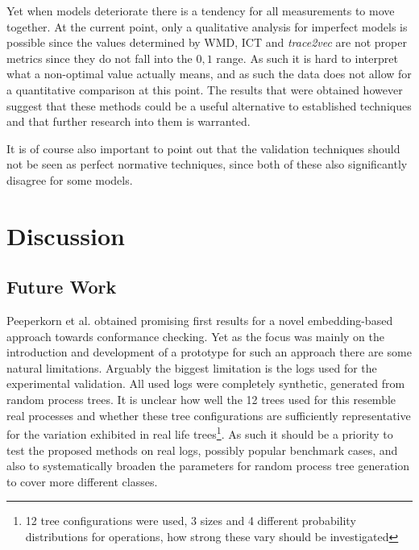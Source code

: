 \documentclass[runningheads]{template/llncs}
\begin{document}
Yet when models deteriorate there is a tendency for all measurements to move together.
At the current point, only a qualitative analysis for imperfect models is possible since the values determined by WMD, ICT and \emph{trace2vec} are not proper metrics since they do not fall into the $0,1$ range.
As such it is hard to interpret what a non-optimal value actually means, and as such the data does not allow for a quantitative comparison  at this point.
The results that were obtained however suggest that these methods could be a useful alternative to established techniques and that further research into them is warranted.

It is of course also important to point out that the validation techniques should not be seen as perfect normative techniques, since both of these also significantly disagree for some models. 

\color{black}
\section{Discussion}
\label{sec:discussion}
\subsection{Future Work}
Peeperkorn et al. obtained promising first results for a novel embedding-based approach towards conformance checking.
Yet as the focus was mainly on the introduction and development of a prototype for such an approach there are some natural limitations.
Arguably the biggest limitation is the logs used for the experimental validation.
All used logs were completely synthetic, generated from random process trees.
It is unclear how well the 12 trees used for this resemble real processes and whether these tree configurations are sufficiently representative for the variation exhibited in real life trees\footnote{12 tree configurations were used, 3 sizes and 4 different probability distributions for operations, how strong these vary should be investigated}.
As such it should be a priority to test the proposed methods on real logs, possibly popular benchmark cases, and also to systematically broaden the parameters for random process tree generation to cover more different classes.
\end{document}
